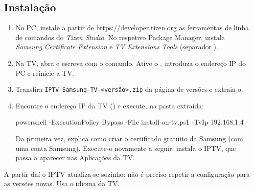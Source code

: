 \subsection{Instalação}
\begin{enumerate}
  \item No PC, instale a partir de \url{https://developer.tizen.org} as
        ferramentas de linha de comandos do \emph{Tizen Studio}. No respetivo
        Package Manager, instale \emph{Samsung Certificate Extension} e
        \emph{TV Extensions Tools} (separador ).
  \item Na TV, abra  e escreva
         com o comando. Ative o , introduza o endereço IP do PC e reinicie a TV.
  \item Transfira \texttt{IPTV-Samsung-TV-\textless versão\textgreater.zip}
        da página de versões e extraia-o.
  \item Encontre o endereço IP da TV () e
        execute, na pasta extraída:
\begin{center}
\begin{minipage}{0.92\linewidth}
\small\ttfamily powershell -ExecutionPolicy Bypass -File install-on-tv.ps1 -TvIp 192.168.1.4
\end{minipage}
\end{center}
        Da primeira vez, explica como criar o certificado gratuito da Samsung
        (com uma conta Samsung). Execute-o novamente a seguir: instala o
        IPTV, que passa a aparecer nas Aplicações da TV.
\end{enumerate}
A partir daí o IPTV atualiza-se sozinho: não é preciso repetir a
configuração para as versões novas. Usa o idioma da TV.

